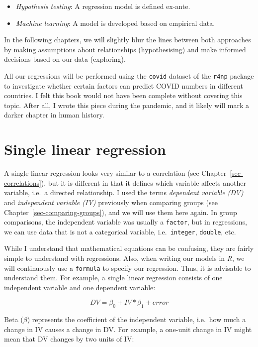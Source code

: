 \documentclass[
  letterpaper,
]{krantz}
\begin{document}
\begin{itemize}
\item
  \emph{Hypothesis testing}: A regression model is defined ex-ante.
\item
  \emph{Machine learning}: A model is developed based on empirical data.
\end{itemize}

In the following chapters, we will slightly blur the lines between both
approaches by making assumptions about relationships (hypothesising) and
make informed decisions based on our data (exploring).

All our regressions will be performed using the \texttt{covid} dataset
of the \texttt{r4np} package to investigate whether certain factors can
predict COVID numbers in different countries. I felt this book would not
have been complete without covering this topic. After all, I wrote this
piece during the pandemic, and it likely will mark a darker chapter in
human history.

\section{Single linear regression}\label{sec-single-linear-regression}

A single linear regression looks very similar to a correlation (see
Chapter~\ref{sec-correlations}), but it is different in that it defines
which variable affects another variable, i.e.~a directed relationship. I
used the terms \emph{dependent variable (DV)} and \emph{independent
variable (IV)} previously when comparing groups (see
Chapter~\ref{sec-comparing-groups}), and we will use them here again. In
group comparisons, the independent variable was usually a
\texttt{factor}, but in regressions, we can use data that is not a
categorical variable, i.e.~\texttt{integer}, \texttt{double}, etc.

While I understand that mathematical equations can be confusing, they
are fairly simple to understand with regressions. Also, when writing our
models in \emph{R}, we will continuously use a \texttt{formula} to
specify our regression. Thus, it is advisable to understand them. For
example, a single linear regression consists of one independent variable
and one dependent variable:

\[
DV = \beta_{0} + IV * \beta_{1} + error
\]

Beta (\(\beta\)) represents the coefficient of the independent variable,
i.e.~how much a change in IV causes a change in DV. For example, a
one-unit change in IV might mean that DV changes by two units of IV:
\end{document}
